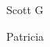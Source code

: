 \documentclass[twocol]{ametsoc}
\begin{document}
\acknowledgments{}

Scott G

Patricia

%
%
%







\end{document}
